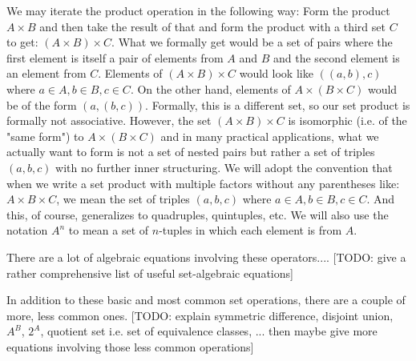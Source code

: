 We may iterate the product operation in the following way: Form the product $A \times B$ and then take the result of that and form the product with a third set $C$ to get: $(A \times B) \times C$. What we formally get would be a set of pairs where the first element is itself a pair of elements from $A$ and $B$ and the second element is an element from $C$. Elements of $(A \times B) \times C$ would look like $((a,b),c)$ where $a \in A, b \in B, c \in C$. On the other hand, elements of $A \times (B \times C)$ would be of the form $(a, (b,c))$. Formally, this is a different set, so our set product is formally not associative. However, the set $(A \times B) \times C$ is isomorphic (i.e. of the "same form") to $A \times (B \times C)$ and in many practical applications, what we actually want to form is not a set of nested pairs but rather a set of triples $(a,b,c)$ with no further inner structuring. We will adopt the convention that when we write a set product with multiple factors without any parentheses like: $A \times B \times C$, we mean the set of triples $(a,b,c)$ where $a \in A, b \in B, c \in C$. And this, of course, generalizes to quadruples, quintuples, etc. We will also use the notation $A^n$ to mean a set of $n$-tuples in which each element is from $A$.

\medskip
There are a lot of algebraic equations involving these operators.... [TODO: give a rather comprehensive list of useful set-algebraic equations]

\medskip
In addition to these basic and most common set operations, there are a couple of more, less common ones. [TODO: explain symmetric difference, disjoint union, $A^B$, $2^A$, quotient set i.e. set of equivalence classes, ... then maybe give more equations involving those less common operations]







